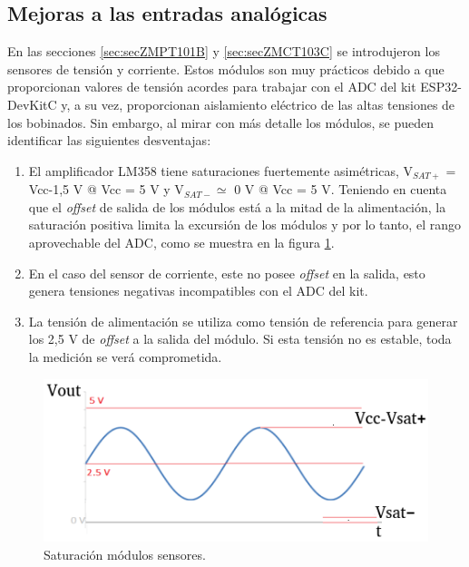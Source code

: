 \subsection{Mejoras a las entradas analógicas}
\label{subsec:mejorasAnalo}
En las secciones \ref{sec:secZMPT101B} y \ref{sec:secZMCT103C} se introdujeron los sensores de tensión y corriente. Estos módulos son muy prácticos debido a que proporcionan valores de tensión acordes para trabajar con el ADC del kit ESP32-DevKitC y, a su vez, proporcionan aislamiento eléctrico de las altas tensiones de los bobinados. Sin embargo, al mirar con más detalle los módulos, se pueden identificar las siguientes desventajas:
\begin{enumerate}
\item El amplificador LM358 tiene saturaciones fuertemente asimétricas, V$_{SAT+}$ = Vcc-1,5 V @ Vcc = 5 V y V$_{SAT-} \simeq $  0 V @ Vcc = 5 V. Teniendo en cuenta que el \textit{offset} de salida de los módulos está a la mitad de la alimentación, la saturación positiva limita la excursión de los módulos y por lo tanto, el rango aprovechable del ADC, como se muestra en la figura \ref{fig:sensSat}. 
\item En el caso del sensor de corriente, este no posee \textit{offset} en la salida, esto genera tensiones negativas incompatibles con el ADC del kit.
\item La tensión de alimentación se utiliza como tensión de referencia para generar los 2,5 V de \textit{offset} a la salida del módulo. Si esta tensión no es estable, toda la medición se verá comprometida.
\end{enumerate}

\begin{figure}[htpb]
	\centering
	\includegraphics[scale=1]{./Figures/ZMPT101B_waves_sat.png}
	\caption{Saturación módulos sensores.}
	\label{fig:sensSat}
\end{figure}

